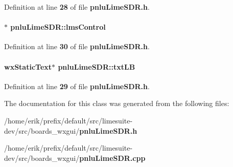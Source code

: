Definition at line {\bf 28} of file {\bf pnlu\+Lime\+S\+D\+R.\+h}.

\paragraph[{lms\+Control}]{$\ast$ pnlu\+Lime\+S\+D\+R\+::lms\+Control\hspace{0.3cm}{\ttfamily [protected]}}\label{classpnluLimeSDR_acf714d50531e18c973348bf0f2d1fa84}


Definition at line {\bf 30} of file {\bf pnlu\+Lime\+S\+D\+R.\+h}.

\paragraph[{txt\+LB}]{\setlength{\rightskip}{0pt plus 5cm}wx\+Static\+Text$\ast$ pnlu\+Lime\+S\+D\+R\+::txt\+LB\hspace{0.3cm}{\ttfamily [protected]}}\label{classpnluLimeSDR_a4c25d5aa29b17aee2d91cd4d67750c1f}


Definition at line {\bf 29} of file {\bf pnlu\+Lime\+S\+D\+R.\+h}.



The documentation for this class was generated from the following files\+:\begin{DoxyCompactItemize}
\item 
/home/erik/prefix/default/src/limesuite-\/dev/src/boards\+\_\+wxgui/{\bf pnlu\+Lime\+S\+D\+R.\+h}\item 
/home/erik/prefix/default/src/limesuite-\/dev/src/boards\+\_\+wxgui/{\bf pnlu\+Lime\+S\+D\+R.\+cpp}\end{DoxyCompactItemize}
